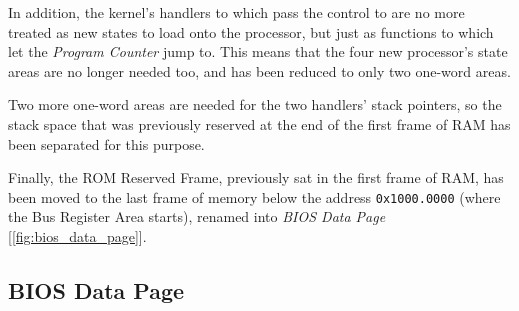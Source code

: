 \documentclass[12pt,a4paper,openright,twoside]{report}
\begin{document}
In addition, the kernel's handlers to which pass the control to are no more treated as new states to load onto the processor, but just as functions to which let the \textit{Program Counter} jump to.
This means that the four new processor's state areas are no longer needed too, and has been reduced to only two one-word areas.

Two more one-word areas are needed for the two handlers' stack pointers, so the stack space that was previously reserved at the end of the first frame of RAM has been separated for this purpose.

Finally, the ROM Reserved Frame, previously sat in the first frame of RAM, has been moved to the last frame of memory below the address \texttt{0x1000.0000} (where the Bus Register Area starts), renamed into \textit{BIOS Data Page} [\autoref{fig:bios_data_page}].

\subsection{BIOS Data Page}
\label{chap:bios_data_page}
\end{document}
